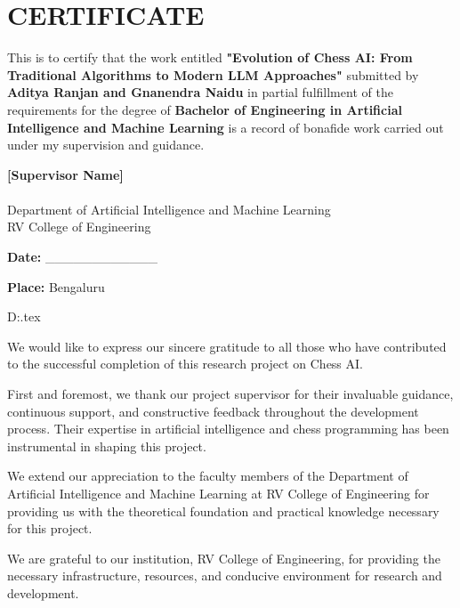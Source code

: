 \documentclass[12pt,a4paper]{report}
\begin{document}
\chapter*{CERTIFICATE}

This is to certify that the work entitled \textbf{"Evolution of Chess AI: From Traditional Algorithms to Modern LLM Approaches"} submitted by \textbf{Aditya Ranjan and Gnanendra Naidu} in partial fulfillment of the requirements for the degree of \textbf{Bachelor of Engineering in Artificial Intelligence and Machine Learning} is a record of bonafide work carried out under my supervision and guidance.

\vspace{2cm}

\begin{flushright}
\textbf{[Supervisor Name]}\\
[Designation]\\
Department of Artificial Intelligence and Machine Learning\\
RV College of Engineering\\
\end{flushright}

\vspace{2cm}

\textbf{Date:} \_\_\_\_\_\_\_\_\_\_\_\_

\textbf{Place:} Bengaluru

\newpage

D:\CHess\demo\report.tex

We would like to express our sincere gratitude to all those who have contributed to the successful completion of this research project on Chess AI.

First and foremost, we thank our project supervisor for their invaluable guidance, continuous support, and constructive feedback throughout the development process. Their expertise in artificial intelligence and chess programming has been instrumental in shaping this project.

We extend our appreciation to the faculty members of the Department of Artificial Intelligence and Machine Learning at RV College of Engineering for providing us with the theoretical foundation and practical knowledge necessary for this project.

We are grateful to our institution, RV College of Engineering, for providing the necessary infrastructure, resources, and conducive environment for research and development.
\end{document}
